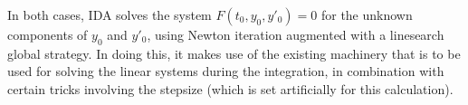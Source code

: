 In both cases, IDA solves the system $F(t_0,y_0,y'_0) = 0$ for the
unknown components of $y_0$ and $y'_0$, using Newton iteration
augmented with a linesearch global strategy.  In doing this, it makes
use of the existing machinery that is to be used for solving the
linear systems during the integration, in combination with certain
tricks involving the stepsize (which is set artificially for this
calculation).


